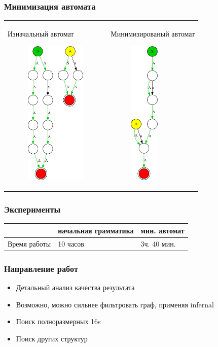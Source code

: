 \documentclass{beamer}
\begin{document}
\begin{frame}
    \frametitle{Минимизация автомата}
    \begin{tabular}{p{5cm} p{5.5cm}}
        Изначальный автомат
        \begin{figure}[t]
            \centering
            \includegraphics[height=7cm]{pictures/initialNFA.pdf}
        \end{figure}
        &
        Минимизированый автомат
        \begin{figure}[t]
            \centering
            \includegraphics[height=7cm]{pictures/minimizedDFA.pdf}
        \end{figure}
    \end{tabular}
\end{frame}

\begin{frame}
    \frametitle{Эксперименты}
    \begin{tabular}{| p{2.5cm} | p{2cm} | p{2.5cm} |}
        \hline
                     & начальная грамматика & мин. автомат \\ \hline
        Время работы & 10 часов             & 3ч. 40 мин. \\ \hline
    \end{tabular}
\end{frame}

\begin{frame}
    \frametitle{Направление работ}
    \begin{itemize}
        \item Детальный анализ качества результата
        \item Возможно, можно сильнее фильтровать граф, применяя infernal
        \item Поиск полноразмерных 16s
        \item Поиск других структур
    \end{itemize}
\end{frame}
\end{document}
